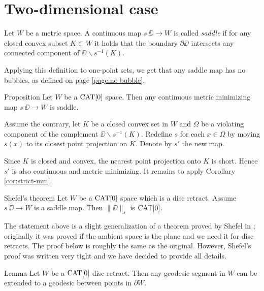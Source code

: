 \documentclass{article}
\begin{document}
\section{Two-dimensional case}\label{Shefel}

Let $W$ be a metric space.
A continuous map $s\:\DD\to W$ is called \emph{saddle} if for any closed convex subset $K\subset W$ it holds that
the boundary $\partial \DD$ intersects
any connected component of $\DD\backslash s^{-1}(K)$.

Applying this definition to one-point sets,
we get that any saddle map has no bubbles, 
as defined on page \ref{page:no-bubble}.


\begin{thm}{Proposition}\label{prop:memisaddle}
Let $W$ be a $\mathop{\rm CAT}\nolimits[0]$ space.
Then any continuous metric minimizing map $s\:\DD\to W$ is saddle.
\end{thm}

Assume the contrary, let $K$ be a closed convex set in $W$
and $\Omega$ be a violating component of the complement $\DD\backslash s^{-1}(K)$. 
Redefine $s$ for each $x\in\Omega$ by moving 
$s(x)$ to its closest point projection on $K$.
Denote by $s'$ the new map. 

Since $K$ is closed and convex, the nearest point projection onto $K$ is short.
Hence $s'$ is also continuous and metric minimizing. 
It remains to apply Corollary \ref{cor:strict-mm}.
\qeds

 






\begin{thm}{Shefel's theorem}\label{thm:shefel-2D}
Let $W$ be a $\mathop{\rm CAT}\nolimits[0]$ space which is a disc retract.
Assume $s\:\DD\to W$ is a saddle map. 
Then $\|\DD\|_s$ is $\mathop{\rm CAT}\nolimits[0]$.
\end{thm}

The statement above is a slight generalization of a theorem proved by Shefel in \cite{shefel-2D};
originally it was proved if the ambient space is the plane and we need it for disc retracts.
The proof below is roughly the same as the original.
However, Shefel's proof was written very tight
and we have decided to provide all details.


\begin{thm}{Lemma}\label{lem:extension}
Let $W$ be a $\mathop{\rm CAT}\nolimits[0]$ disc retract. 
Then any geodesic segment in $W$ can be extended to a geodesic between points in $\partial W$.
\end{thm}
\end{document}
